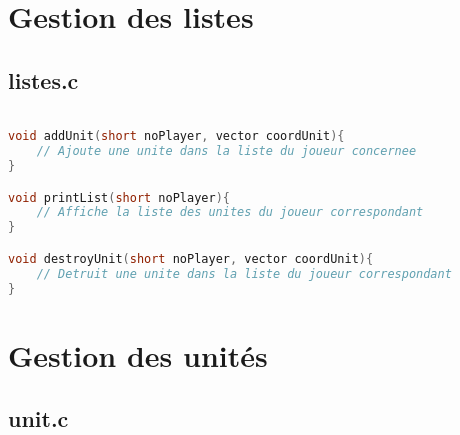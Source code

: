 \documentclass[a4paper,10pt]{extreport}
\begin{document}
\part{Gestion des listes}

\chapter{listes.c}
\vspace{-1cm}

\begin{lstlisting}[language=c]

void addUnit(short noPlayer, vector coordUnit){
	// Ajoute une unite dans la liste du joueur concernee
}

void printList(short noPlayer){
	// Affiche la liste des unites du joueur correspondant
}

void destroyUnit(short noPlayer, vector coordUnit){
	// Detruit une unite dans la liste du joueur correspondant
}

\end{lstlisting}

\part{Gestion des unités}

\chapter{unit.c}
\vspace{-1cm}
\end{document}
